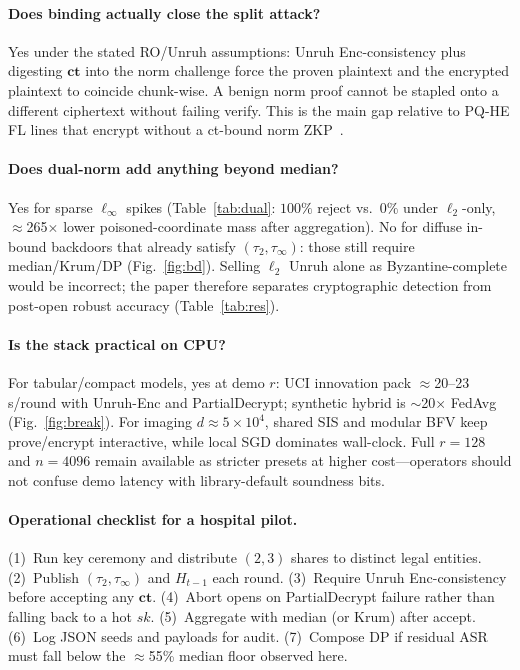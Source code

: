 \documentclass[conference]{IEEEtran}
\begin{document}
\paragraph{Does binding actually close the split attack?}
Yes under the stated RO/Unruh assumptions: Unruh Enc-consistency plus digesting $\mathbf{ct}$ into the norm challenge force the proven plaintext and the encrypted plaintext to coincide chunk-wise. A benign norm proof cannot be stapled onto a different ciphertext without failing verify. This is the main gap relative to PQ-HE FL lines that encrypt without a ct-bound norm ZKP~\cite{patel2025pqfl,lu2024hybrid}.

\paragraph{Does dual-norm add anything beyond median?}
Yes for sparse $\ell_\infty$ spikes (Table~\ref{tab:dual}: $100\%$ reject vs.\ $0\%$ under $\ell_2$-only, $\approx$265$\times$ lower poisoned-coordinate mass after aggregation). No for diffuse in-bound backdoors that already satisfy $(\tau_2,\tau_\infty)$: those still require median/Krum/DP (Fig.~\ref{fig:bd}). Selling $\ell_2$ Unruh alone as Byzantine-complete would be incorrect; the paper therefore separates cryptographic detection from post-open robust accuracy (Table~\ref{tab:res}).

\paragraph{Is the stack practical on CPU?}
For tabular/compact models, yes at demo $r$: UCI innovation pack $\approx$20--23\,s/round with Unruh-Enc and PartialDecrypt; synthetic hybrid is $\sim$20$\times$ FedAvg (Fig.~\ref{fig:break}). For imaging $d{\approx}5{\times}10^{4}$, shared SIS and modular BFV keep prove/encrypt interactive, while local SGD dominates wall-clock. Full $r{=}128$ and $n{=}4096$ remain available as stricter presets at higher cost---operators should not confuse demo latency with library-default soundness bits.

\paragraph{Operational checklist for a hospital pilot.}
(1)~Run key ceremony and distribute $(2,3)$ shares to distinct legal entities. (2)~Publish $(\tau_2,\tau_\infty)$ and $H_{t-1}$ each round. (3)~Require Unruh Enc-consistency before accepting any $\mathbf{ct}$. (4)~Abort opens on PartialDecrypt failure rather than falling back to a hot $sk$. (5)~Aggregate with median (or Krum) after accept. (6)~Log JSON seeds and payloads for audit. (7)~Compose DP if residual ASR must fall below the $\approx$55\% median floor observed here.
\end{document}
